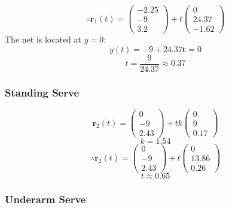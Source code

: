 \documentclass{article}
\begin{document}
							\[\therefore \mathbf{r}_1(t) = 
								\begin{pmatrix} -2.25 \\ -9 \\ 3.2 \end{pmatrix} 
								+ t \begin{pmatrix} 0 \\ 24.37 \\ -1.62 \end{pmatrix}\]
								The net is located at \(y = 0\):
								\[y(t) = -9 + 24.37\mathbf{t} = 0\]
								\[t = \frac{9}{24.37} \approx 0.37\]


								\subsubsection*{Standing Serve}

								\[\mathbf{r}_2(t) = 
									\begin{pmatrix} 0 \\ -9 \\ 2.43 \end{pmatrix} 
									+ tk \begin{pmatrix} 0 \\ 9 \\ 0.17 \end{pmatrix}\]
									\[k = 1.54\]
									\[\therefore \mathbf{r}_2(t) = 
										\begin{pmatrix} 0 \\ -9 \\ 2.43 \end{pmatrix} 
										+ t \begin{pmatrix} 0 \\ 13.86 \\ 0.26 \end{pmatrix}\]
										\[t \approx 0.65\]


										\subsubsection*{Underarm Serve}
\end{document}
